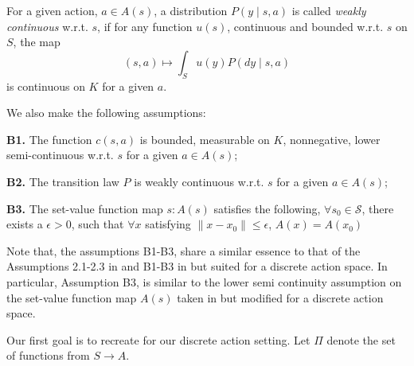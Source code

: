 For a given action, $a\in A(s)$, a distribution \( P(y \mid s, a) \) is called \emph{weakly continuous} w.r.t. $s$, if for any function \( u(s) \), continuous and bounded w.r.t. $s$ on \( S \),  the map
\[
(s, a) \mapsto \int_S u(y) P(dy \mid s, a)
\]
is continuous on \( K \) for a given $a$.


We also make the following assumptions:

\textbf{B1.} The function \( c(s, a) \) is bounded, measurable on \( K \), nonnegative, lower semi-continuous w.r.t. $s$ for a given $a\in A(s)$;

\textbf{B2.} The transition law \( P \) is weakly continuous w.r.t. $s$ for a given $a\in A(s)$;

\textbf{B3.} The set-value function map $s:A(s)$ satisfies the following, $\forall s_{0}\in \mathcal{S}$, there exists a $\epsilon >0$, such that $\forall x$ satisfying $\|x-x_{0}\|\leq \epsilon$, $A(x)=A(x_0)$

Note that, the assumptions B1-B3, share a similar essence to that of the Assumptions 2.1-2.3 in \citet{hernandez1992discrete} and B1-B3 in \citet{sootla2022saute} but suited for a discrete action space. In particular, Assumption B3, is similar to the lower semi continuity assumption on the set-value function map $A(s)$ taken in \citet{sootla2022saute,hernandez1992discrete} but modified for a discrete action space. 


Our first goal is to recreate \citet[Lemma 2.7]{hernandez1992discrete} for our discrete action setting. Let $\Pi$ denote the set of functions from $S\to A$.

